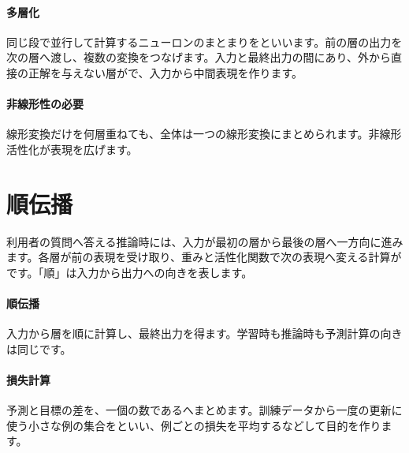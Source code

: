 \paragraph{多層化}
        同じ段で並行して計算するニューロンのまとまりをといいます。前の層の出力を次の層へ渡し、複数の変換をつなげます。入力と最終出力の間にあり、外から直接の正解を与えない層がで、入力から中間表現を作ります。

\paragraph{非線形性の必要}
        線形変換だけを何層重ねても、全体は一つの線形変換にまとめられます。非線形活性化が表現を広げます。

\par
\endgroup
\par
\endgroup


\section{順伝播}
\label{sec:06-machine-learning-18}

利用者の質問へ答える推論時には、入力が最初の層から最後の層へ一方向に進みます。各層が前の表現を受け取り、重みと活性化関数で次の表現へ変える計算がです。「順」は入力から出力への向きを表します。

\begingroup
  \centering
  \vspace{5mm}
\begingroup
\paragraph{順伝播}
        入力から層を順に計算し、最終出力を得ます。学習時も推論時も予測計算の向きは同じです。

\par
\endgroup
\medskip
\begingroup
\paragraph{損失計算}
        予測と目標の差を、一個の数であるへまとめます。訓練データから一度の更新に使う小さな例の集合をといい、例ごとの損失を平均するなどして目的を作ります。

